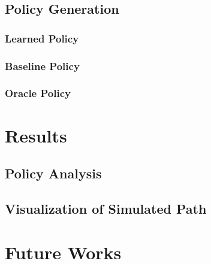 \documentclass[letterpaper, 10 pt, conference]{ieeeconf}
\begin{document}
\subsection{Policy Generation}
\subsubsection{Learned Policy}

\subsubsection{Baseline Policy}

\subsubsection{Oracle Policy}

\section{Results}
\subsection{Policy Analysis}

\subsection{Visualization of Simulated Path}

\section{Future Works}


\end{document}
